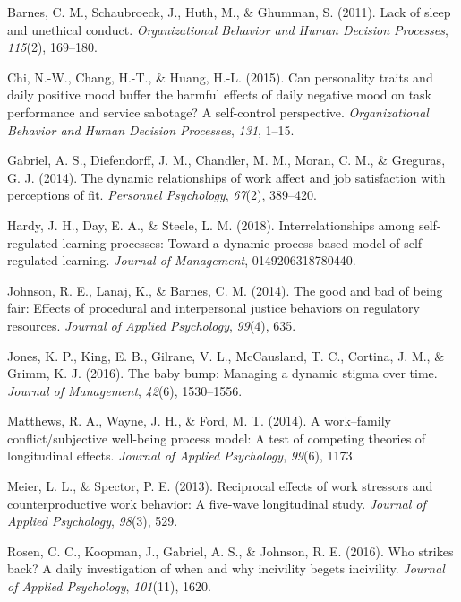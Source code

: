 \documentclass[english,,man]{apa6}
\theoremstyle{definition}
\theoremstyle{definition}
\theoremstyle{definition}
\theoremstyle{remark}
\begin{document}
\setlength{\parindent}{-0.5in}
\setlength{\leftskip}{0.5in}

\hypertarget{refs}{}
\leavevmode\hypertarget{ref-barnes2011}{}%
Barnes, C. M., Schaubroeck, J., Huth, M., \& Ghumman, S. (2011). Lack of
sleep and unethical conduct. \emph{Organizational Behavior and Human
Decision Processes}, \emph{115}(2), 169--180.

\leavevmode\hypertarget{ref-chi2015}{}%
Chi, N.-W., Chang, H.-T., \& Huang, H.-L. (2015). Can personality traits
and daily positive mood buffer the harmful effects of daily negative
mood on task performance and service sabotage? A self-control
perspective. \emph{Organizational Behavior and Human Decision
Processes}, \emph{131}, 1--15.

\leavevmode\hypertarget{ref-gabriel2014}{}%
Gabriel, A. S., Diefendorff, J. M., Chandler, M. M., Moran, C. M., \&
Greguras, G. J. (2014). The dynamic relationships of work affect and job
satisfaction with perceptions of fit. \emph{Personnel Psychology},
\emph{67}(2), 389--420.

\leavevmode\hypertarget{ref-hardy2018}{}%
Hardy, J. H., Day, E. A., \& Steele, L. M. (2018). Interrelationships
among self-regulated learning processes: Toward a dynamic process-based
model of self-regulated learning. \emph{Journal of Management},
0149206318780440.

\leavevmode\hypertarget{ref-johnson2014}{}%
Johnson, R. E., Lanaj, K., \& Barnes, C. M. (2014). The good and bad of
being fair: Effects of procedural and interpersonal justice behaviors on
regulatory resources. \emph{Journal of Applied Psychology},
\emph{99}(4), 635.

\leavevmode\hypertarget{ref-jones2016}{}%
Jones, K. P., King, E. B., Gilrane, V. L., McCausland, T. C., Cortina,
J. M., \& Grimm, K. J. (2016). The baby bump: Managing a dynamic stigma
over time. \emph{Journal of Management}, \emph{42}(6), 1530--1556.

\leavevmode\hypertarget{ref-matthews2014}{}%
Matthews, R. A., Wayne, J. H., \& Ford, M. T. (2014). A work--family
conflict/subjective well-being process model: A test of competing
theories of longitudinal effects. \emph{Journal of Applied Psychology},
\emph{99}(6), 1173.

\leavevmode\hypertarget{ref-meier2013}{}%
Meier, L. L., \& Spector, P. E. (2013). Reciprocal effects of work
stressors and counterproductive work behavior: A five-wave longitudinal
study. \emph{Journal of Applied Psychology}, \emph{98}(3), 529.

\leavevmode\hypertarget{ref-rosen2016}{}%
Rosen, C. C., Koopman, J., Gabriel, A. S., \& Johnson, R. E. (2016). Who
strikes back? A daily investigation of when and why incivility begets
incivility. \emph{Journal of Applied Psychology}, \emph{101}(11), 1620.
\end{document}
